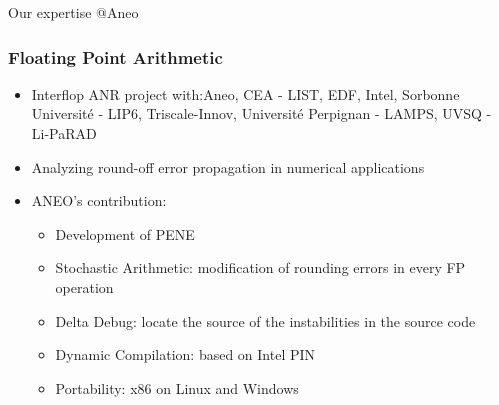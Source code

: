 \documentclass[10pt,aspectratio=1609]{beamer}
\begin{document}
\begin{section}{Our expertise @Aneo}
  \begin{frame}
    \frametitle{Floating Point Arithmetic}
    \begin{itemize}
      \item Interflop ANR project with:Aneo, CEA - LIST, EDF, Intel, Sorbonne Université - LIP6, Triscale-Innov, Université Perpignan - LAMPS, UVSQ - Li-PaRAD
      \item Analyzing round-off error propagation in numerical applications
      \item ANEO's contribution:
      \begin{itemize}
        \item Development of PENE
        \item Stochastic Arithmetic: modification of rounding errors in every FP operation
        \item Delta Debug: locate the source of the instabilities in the source code
        \item Dynamic Compilation: based on Intel PIN
        \item Portability: x86 on Linux and Windows
      \end{itemize}
    \end{itemize}
  \end{frame}
\end{section}
\end{document}
